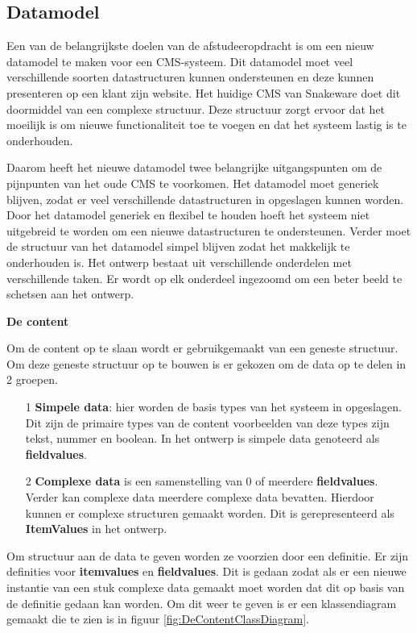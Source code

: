 \subsection{Datamodel}
Een van de belangrijkste doelen van de afstudeeropdracht is om een nieuw datamodel te maken voor een CMS-systeem.
Dit datamodel moet veel verschillende soorten datastructuren kunnen ondersteunen en deze kunnen presenteren op een klant zijn website.
Het huidige CMS van Snakeware doet dit doormiddel van een complexe structuur.
Deze structuur zorgt ervoor dat het moeilijk is om nieuwe functionaliteit toe te voegen en dat het systeem lastig is te onderhouden.

\whitespace
Daarom heeft het nieuwe datamodel twee belangrijke uitgangspunten om de pijnpunten van het oude CMS te voorkomen.
Het datamodel moet generiek blijven, zodat er veel verschillende datastructuren in opgeslagen kunnen worden.
Door het datamodel generiek en flexibel te houden hoeft het systeem niet uitgebreid te worden om een nieuwe datastructuren te ondersteunen.
Verder moet de structuur van het datamodel simpel blijven zodat het makkelijk te onderhouden is.
Het ontwerp bestaat uit verschillende onderdelen met verschillende taken.
Er wordt op elk onderdeel ingezoomd om een beter beeld te schetsen aan het ontwerp.

\whitespace[2]
\textbf{De content}

\whitespace
Om de content op te slaan wordt er gebruikgemaakt van een geneste structuur.
Om deze geneste structuur op te bouwen is er gekozen om de data op te delen in 2 groepen.

\whitespace
\begin{itemize}
    \item[1] \textbf{Simpele data}: hier worden de basis types van het systeem in opgeslagen.
    Dit zijn de primaire types van de content voorbeelden van deze types zijn tekst, nummer en boolean.
    In het ontwerp is simpele data genoteerd als \textbf{fieldvalues}.
    \item[2] \textbf{Complexe data} is een samenstelling van 0 of meerdere \textbf{fieldvalues}.
    Verder kan complexe data meerdere complexe data bevatten. 
    Hierdoor kunnen er complexe structuren gemaakt worden.
    Dit is gerepresenteerd als \textbf{ItemValues} in het ontwerp.
\end{itemize}

\whitespace
Om structuur aan de data te geven worden ze voorzien door een definitie.
Er zijn definities voor \textbf{itemvalues} en \textbf{fieldvalues}.
Dit is gedaan zodat als er een nieuwe instantie van een stuk complexe data gemaakt moet worden dat dit op basis van de definitie gedaan kan worden.
Om dit weer te geven is er een klassendiagram gemaakt die te zien is in figuur \ref{fig:DeContentClassDiagram}.


